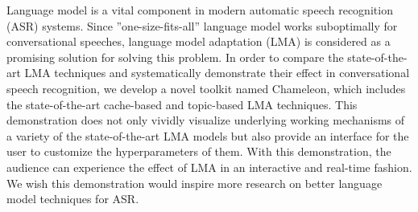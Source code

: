 Language model is a vital component in modern automatic speech recognition (ASR) systems. Since ''one-size-fits-all'' language model works suboptimally for conversational speeches, language model adaptation (LMA) is considered as a promising solution for solving this problem. In order to compare the state-of-the-art LMA techniques and systematically demonstrate their effect in conversational speech recognition, we develop a novel toolkit named Chameleon, which includes the state-of-the-art cache-based and topic-based LMA techniques. This demonstration does not only vividly visualize underlying working mechanisms of a variety of the state-of-the-art LMA models but also provide an interface for the user to customize the hyperparameters of them. With this demonstration, the audience can experience the effect of LMA in an interactive and real-time fashion. We wish this demonstration would inspire more research on better language model techniques for ASR.